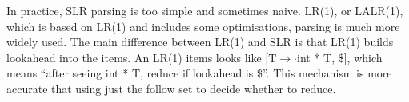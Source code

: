 In practice, SLR parsing is too simple and sometimes naive. LR(1), or LALR(1), which is based on LR(1) and includes some optimisations, parsing is much more widely used. The main difference between LR(1) and SLR is that LR(1) builds lookahead into the items. An LR(1) items looks like [T$\rightarrow\cdot$int * T, \$], which means ``after seeing int * T, reduce if lookahead is \$''. This mechanism is more accurate that using just the follow set to decide whether to reduce.

\ifx\PREAMBLE\undefined

\fi